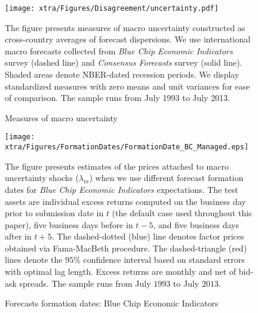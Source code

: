 \clearpage
\begin{landscape}
	\begin{figure}
		\begin{center}
			\texttt{[image: xtra/Figures/Disagreement/uncertainty.pdf]}
		\end{center}
		
		\caption{Measures of macro uncertainty} \label{fig:aggregate_disagreement}
		\begin{footnotesize}
			The figure presents measures of macro uncertainty constructed as cross-country averages of forecast dispersions. We use international macro forecasts collected from \textit{Blue Chip Economic Indicators} survey (dashed line) and \textit{Consensus Forecasts} survey (solid line). Shaded areas denote NBER-dated recession periods. We display standardized measures with zero means and unit variances for ease of comparison. The sample runs from July 1993 to July 2013.
		\end{footnotesize}
		
	\end{figure}
\end{landscape}
\newpage
\clearpage

\begin{landscape}
	\begin{figure}
		\begin{center}
			\texttt{[image: xtra/Figures/FormationDates/FormationDate\_BC\_Managed.eps]}
		\end{center}
		\vspace{4cm}
		
		\caption{Forecasts formation dates: Blue Chip Economic Indicators} \label{fig:formation_dates_BC_managed} \smallskip
		\begin{footnotesize}
			The figure presents estimates of the prices attached to macro uncertainty shocks ($\lambda_{m}$) when we use different forecast formation dates for \emph{Blue Chip Economic Indicators} expectations. The test assets are individual excess returns computed on the business day prior to submission date in $t$ (the default case used throughout this paper), five business days before in $t-5$, and five business days after in $t+5$. The dashed-dotted (blue) line denotes factor prices obtained via Fama-MacBeth procedure. The dashed-triangle (red) lines denote the $95\%$ confidence interval based on \citet{newey_west1987} standard errors with \citet{andrews1991} optimal lag length. Excess returns are monthly and net of bid-ask spreads. The sample runs from July $1993$ to July $2013$.
		\end{footnotesize}
	\end{figure}
\end{landscape}
\newpage
\clearpage

